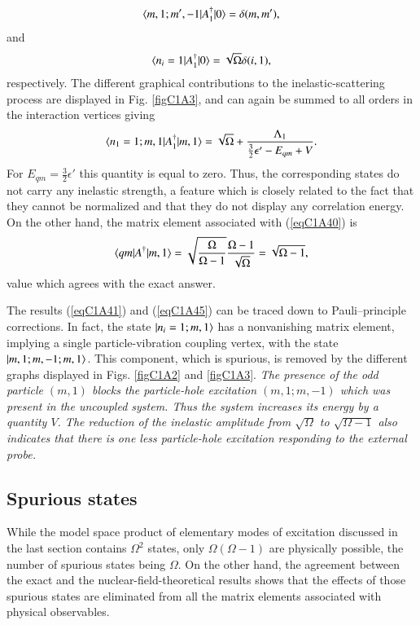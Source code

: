  \begin{align}\label{eqC1A42} 
\langle {m,1;m',-1|A_1^\dagger|0} \rangle=\delta(m,m'),
 \end{align}
and
 \begin{align}\label{eqC1A43} 
\langle {n_i=1|A_1^\dagger|0} \rangle=\sqrt{\Omega}\delta(i,1),
 \end{align}
respectively. The different graphical contributions to the inelastic-scattering
process are displayed in Fig. \ref{figC1A3}, and can again be summed to all orders in the
interaction vertices giving
 \begin{align}\label{eqC1A44} 
\langle {n_1=1;m,1|A_1^\dagger|m,1} \rangle=\sqrt{\Omega}+\frac{\Lambda_1}{\frac{3}{2}\epsilon'-E_{qm}+V}.
 \end{align}
For $E_{qm}=\frac{3}{2}\epsilon'$ this quantity is equal to zero. Thus, the corresponding states
do not carry any inelastic strength, a feature which is closely related to the
fact that they cannot be normalized and that they do not display any correlation energy.
On the other hand, the matrix element associated with (\ref{eqC1A40}) is
 \begin{align}\label{eqC1A45} 
\langle {qm|A^\dagger|m,1} \rangle=\sqrt{\frac{\Omega}{\Omega-1}}\frac{\Omega-1}{\sqrt{\Omega}}=\sqrt{\Omega-1},
 \end{align}
value which agrees with the exact answer.




The results (\ref{eqC1A41}) and (\ref{eqC1A45}) can be traced down to Pauli--principle corrections. In fact, the state $|{n_i=1;m,1} \rangle$ has a nonvanishing matrix element,
implying a single particle-vibration coupling vertex, with the state $|{m,1;m,-1;m,1} \rangle$. This component, which is spurious, is removed by the different graphs displayed in Figs. \ref{figC1A2} and \ref{figC1A3}. \textit{The presence of the odd particle
$(m, 1)$ blocks the particle-hole excitation $(m,1; m,- 1)$ which was present in
the uncoupled system. Thus the system increases its energy by a quantity $V$.
The reduction of the inelastic amplitude from $\sqrt{\Omega}$ to $\sqrt{\Omega-1}$  also indicates
that there is one less particle-hole excitation responding to the external probe.}
\subsection{Spurious states}\label{C1S7sS3}
While the model space product of elementary modes of excitation discussed
in the last section contains $\Omega^2$ states, only $\Omega(\Omega-1)$ are physically possible,
the number of spurious states being $\Omega$.  On the other hand, the agreement
between the exact and the nuclear-field-theoretical results shows that the effects of those spurious states are eliminated from all the matrix elements associated with physical observables.



